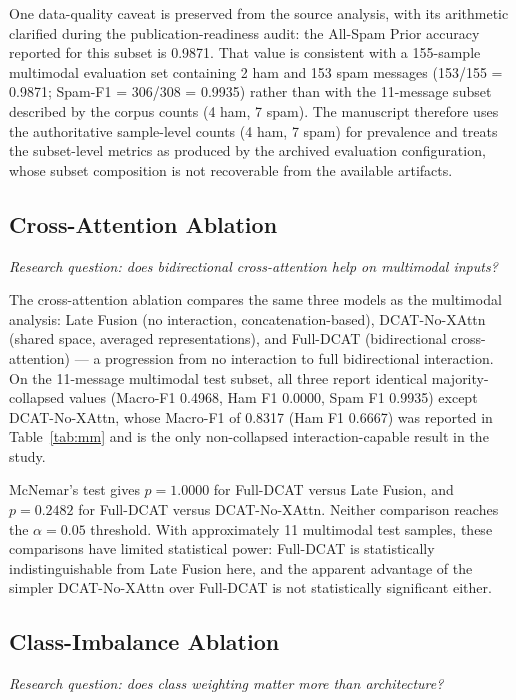\documentclass[10pt,twoside]{article}
\begin{document}
One data-quality caveat is preserved from the source analysis, with its arithmetic clarified during the publication-readiness audit: the All-Spam Prior accuracy reported for this subset is 0.9871. That value is consistent with a 155-sample multimodal evaluation set containing 2 ham and 153 spam messages (153/155 = 0.9871; Spam-F1 = 306/308 = 0.9935) rather than with the 11-message subset described by the corpus counts (4 ham, 7 spam). The manuscript therefore uses the authoritative sample-level counts (4 ham, 7 spam) for prevalence and treats the subset-level metrics as produced by the archived evaluation configuration, whose subset composition is not recoverable from the available artifacts.

\subsection{Cross-Attention Ablation}\label{sec:xattn-ablation}

\emph{Research question: does bidirectional cross-attention help on multimodal inputs?}

The cross-attention ablation compares the same three models as the multimodal analysis: Late Fusion (no interaction, concatenation-based), DCAT-No-XAttn (shared space, averaged representations), and Full-DCAT (bidirectional cross-attention) --- a progression from no interaction to full bidirectional interaction. On the 11-message multimodal test subset, all three report identical majority-collapsed values (Macro-F1 0.4968, Ham F1 0.0000, Spam F1 0.9935) except DCAT-No-XAttn, whose Macro-F1 of 0.8317 (Ham F1 0.6667) was reported in Table~\ref{tab:mm} and is the only non-collapsed interaction-capable result in the study.

McNemar's test gives $p = 1.0000$ for Full-DCAT versus Late Fusion, and $p = 0.2482$ for Full-DCAT versus DCAT-No-XAttn. Neither comparison reaches the $\alpha = 0.05$ threshold. With approximately 11 multimodal test samples, these comparisons have limited statistical power: Full-DCAT is statistically indistinguishable from Late Fusion here, and the apparent advantage of the simpler DCAT-No-XAttn over Full-DCAT is not statistically significant either.

\subsection{Class-Imbalance Ablation}\label{sec:imbalance-ablation}

\emph{Research question: does class weighting matter more than architecture?}
\end{document}
